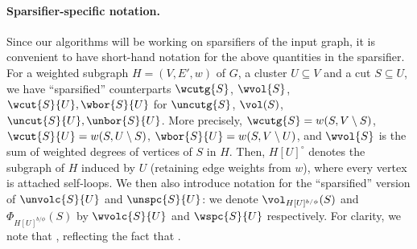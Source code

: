 \paragraph{Sparsifier-specific notation.}
Since our algorithms will be working on sparsifiers of the input graph, it is convenient to have short-hand notation for the above quantities in the sparsifier. For a weighted subgraph $H=(V,E',w)$ of $G$, a cluster $U \subseteq V$ and a cut $S \subseteq U$, we have ``sparsified'' counterparts $\wcutg{S}$, $\wvol{S}$, $\wcut{S}{U},\wbor{S}{U}$ for $\uncutg{S}$, $\vol(S)$, $\uncut{S}{U},\unbor{S}{U}$. More precisely, $\wcutg{S}=w(S,V\setminus S)$, $\wcut{S}{U}=w(S,U\setminus S)$, $\wbor{S}{U}=w(S,V\setminus U)$, and $\wvol{S}$ is the sum of weighted degrees of vertices of $S$ in $H$. Then, $H[U]^\circ$ denotes the subgraph of $H$ induced by $U$ (retaining edge weights from $w$), where every vertex is attached   self-loops. We then also introduce notation for the ``sparsified'' version of $\unvolc{S}{U}$ and $\unspc{S}{U}$: we denote $\vol_{H[U]^{b/\phi}}(S)$ and $\Phi_{H[U]^{b/\phi}}(S)$ by $\wvolc{S}{U}$ and $\wspc{S}{U}$ respectively. For clarity, we note that , reflecting the fact that .